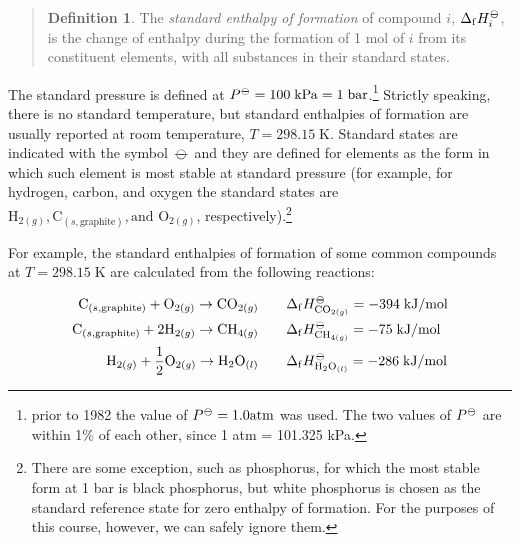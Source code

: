 \documentclass[
  9pt,
]{extbook}
\theoremstyle{definition}
\newtheorem{definition}{Definition}[chapter]
\theoremstyle{definition}
\theoremstyle{definition}
\theoremstyle{definition}
\theoremstyle{remark}
\begin{document}
\begin{quote}
\begin{definition}
\protect\hypertarget{def:stdenthapies}{}\label{def:stdenthapies}The \emph{standard enthalpy of formation} of compound \(i\), \(\Delta_{\mathrm{f}} H_i^{-\kern-6pt{\ominus}\kern-6pt-}\), is the change of enthalpy during the formation of 1 mol of \(i\) from its constituent elements, with all substances in their standard states.
\end{definition}
\end{quote}

The standard pressure is defined at \(P^{{-\kern-6pt{\ominus}\kern-6pt-}} = 100 \; \mathrm{kPa} = 1 \; \mathrm{bar}\).\footnote{prior to 1982 the value of \(P^{{-\kern-6pt{\ominus}\kern-6pt-}} = 1.0 \mathrm{ atm}\) was used. The two values of \(P^{-\kern-6pt{\ominus}\kern-6pt-}\) are within 1\% of each other, since 1 atm = 101.325 kPa.} Strictly speaking, there is no standard temperature, but standard enthalpies of formation are usually reported at room temperature, \(T = 298.15 \; \mathrm{K}\). Standard states are indicated with the symbol \({-\kern-6pt{\ominus}\kern-6pt-}\) and they are defined for elements as the form in which such element is most stable at standard pressure (for example, for hydrogen, carbon, and oxygen the standard states are \(\mathrm{H}_{2(g)}, \mathrm{C}_{(s,\text{graphite})}, \text{and }\mathrm{O}_{2(g)}\), respectively).\footnote{There are some exception, such as phosphorus, for which the most stable form at 1 bar is black phosphorus, but white phosphorus is chosen as the standard reference state for zero enthalpy of formation. For the purposes of this course, however, we can safely ignore them.}

For example, the standard enthalpies of formation of some common compounds at \(T = 298.15 \; \mathrm{K}\) are calculated from the following reactions:

\begin{equation}
\begin{aligned}
  \mathrm{C}_{(s,\text{graphite})}+\mathrm{O}_{2(g)} \rightarrow \mathrm{CO}_{2(g)} \qquad & \Delta_{\mathrm{f}} H_{\mathrm{CO}_{2(g)}}^{-\kern-6pt{\ominus}\kern-6pt-}= -394 \; \text{kJ/mol} \\
   \mathrm{C}_{(s,\text{graphite})}+2 \mathrm{H}_{2(g)} \rightarrow \mathrm{CH}_{4(g)} \qquad & \Delta_{\mathrm{f}} H_{\mathrm{CH}_{4(g)}}^{-\kern-6pt{\ominus}\kern-6pt-}= -75 \; \text{kJ/mol} \\ 
   \mathrm{H}_{2(g)}+\frac{1}{2} \mathrm{O}_{2(g)} \rightarrow \mathrm{H}_2 \mathrm{O}_{(l)} \qquad & \Delta_{\mathrm{f}} H_{\mathrm{H}_2 \mathrm{O}_{(l)}}^{-\kern-6pt{\ominus}\kern-6pt-}= -286 \; \text{kJ/mol} 
\end{aligned}
\label{eq:someDfH}
\end{equation}
\end{document}
